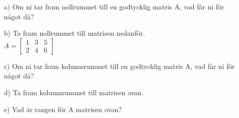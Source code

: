\begin{itemize}
	\item[a) ] Om ni tar fram nollrummet till en godtycklig matris A, vad får ni för något då?
	\item[b) ] Ta fram nollrummet till matrisen nedanför. \\
	$A=\begin{bmatrix}1 & 3 & 5\\ 2 & 4 & 6 \end{bmatrix}$
	\item[c) ] Om ni tar fram kolumnrummet till en godtycklig matris A, vad får ni för något då?
	\item[d) ] Ta fram kolumnrummet till matrisen ovan. 
	\item[e) ] Vad är rangen för A matrisen ovan? 
\end{itemize}